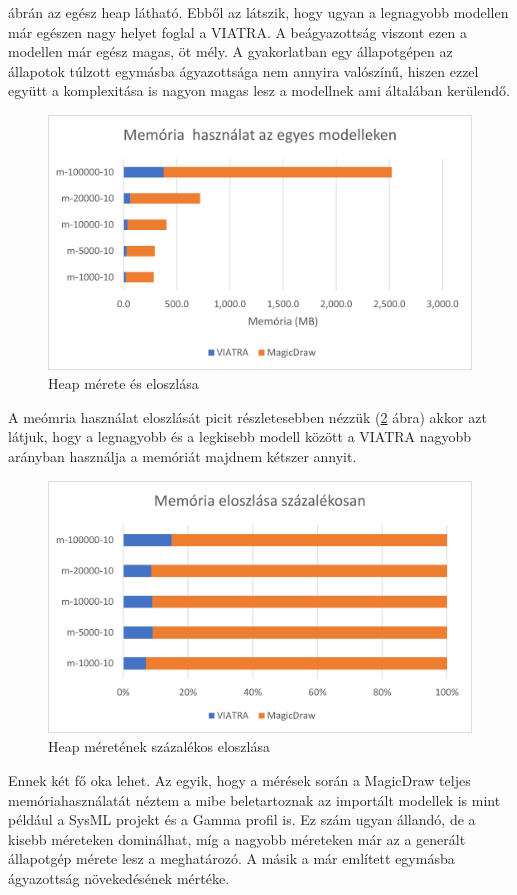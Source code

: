   ábrán az egész heap látható. Ebből az látszik, hogy ugyan a legnagyobb modellen már egészen nagy helyet foglal a VIATRA. A beágyazottság viszont ezen a modellen már egész magas, öt mély. A gyakorlatban egy állapotgépen az állapotok túlzott egymásba ágyazottsága nem annyira valószínű, hiszen ezzel együtt a komplexitása is nagyon magas lesz a modellnek ami általában kerülendő.
 \begin{figure}[!ht]
 	\centering
 	\includegraphics[width=12cm, keepaspectratio]{figures/evaluation/mem1.png}
 	\caption{Heap mérete és eloszlása}
 	\label{fig:mem1}
 \end{figure}
\newpage
A meómria használat eloszlását picit részletesebben nézzük (\ref{fig:mem2} ábra) akkor azt látjuk, hogy a legnagyobb és a legkisebb modell között a VIATRA nagyobb arányban használja a memóriát majdnem kétszer annyit.
 \begin{figure}[!ht]
	\centering
	\includegraphics[width=12cm, keepaspectratio]{figures/evaluation/mem2.png}
	\caption{Heap méretének százalékos eloszlása}
	\label{fig:mem2}
\end{figure}
Ennek két fő oka lehet. Az egyik, hogy a mérések során a MagicDraw teljes memóriahasználatát néztem a mibe beletartoznak az importált modellek is mint például a SysML projekt és a Gamma profil is. Ez szám ugyan állandó, de a kisebb méreteken dominálhat, míg a nagyobb méreteken már az a generált állapotgép mérete lesz a meghatározó. A másik a már említett egymásba ágyazottság növekedésének mértéke.

